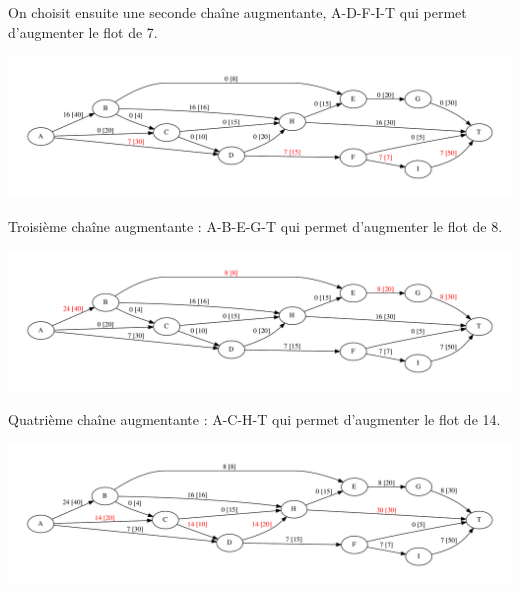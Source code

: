 \begin{frame}{}
    On choisit ensuite une seconde chaîne augmentante, A-D-F-I-T qui permet d'augmenter le flot de 7.    
    \begin{center}
        \includegraphics[width=\textwidth]{tutorials/pcc/figs/reseau-2.pdf}
    \end{center}
   
\end{frame}

\begin{frame}{}
    Troisième chaîne augmentante : A-B-E-G-T qui permet d'augmenter le flot de 8. 
    \begin{center}
        \includegraphics[width=\textwidth]{tutorials/pcc/figs/reseau-3.pdf}
    \end{center}
   
\end{frame}

\begin{frame}{}
    Quatrième chaîne augmentante : A-C-H-T qui permet d'augmenter le flot de 14.
    \begin{center}
        \includegraphics[width=\textwidth]{tutorials/pcc/figs/reseau-4.pdf}
    \end{center}
   
\end{frame}

